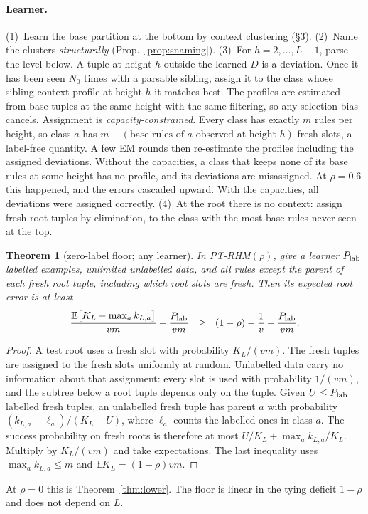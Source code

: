 \documentclass[11pt]{article}
\newtheorem{theorem}{Theorem}
\theoremstyle{definition}
\newcommand{\E}{\mathbb{E}}
\begin{document}
\paragraph{Learner.} (1)~Learn the base partition at the bottom by context clustering
(\S3). (2)~Name the clusters \emph{structurally} (Prop.~\ref{prop:snaming}). (3)~For
$h=2,\dots,L-1$, parse the level below. A tuple at height $h$ outside the learned $D$ is a
deviation. Once it has been seen $N_0$ times with a parsable sibling, assign it to the class
whose sibling-context profile at height $h$ it matches best. The profiles are estimated from
base tuples at the same height with the same filtering, so any selection bias cancels.
Assignment is \emph{capacity-constrained}. Every class has exactly $m$ rules per height, so class
$a$ has $m-(\text{base rules of $a$ observed at height $h$})$ fresh slots, a label-free
quantity. A few EM rounds then re-estimate the profiles including the assigned deviations.
Without the capacities, a class that keeps none of its base rules at some height has no profile,
and its deviations are misassigned. At $\rho=0.6$ this happened, and the errors cascaded upward.
With the capacities, all deviations were assigned correctly. (4)~At
the root there is no context: assign fresh root tuples by elimination, to the class with the
most base rules never seen at the top.

\begin{theorem}[zero-label floor; any learner]\label{thm:ptlower}
In PT-RHM$(\rho)$, give a learner $P_{\rm lab}$ labelled examples, unlimited unlabelled data,
and \emph{all} rules except the parent of each fresh root tuple, including which root slots are
fresh. Then its expected root error is at least
\[
\frac{\E\big[K_L-\max_ak_{L,a}\big]}{vm}-\frac{P_{\rm lab}}{vm}\ \ \ge\ \ (1-\rho)-\frac1v-\frac{P_{\rm lab}}{vm}.
\]
\end{theorem}
\begin{proof}
A test root uses a fresh slot with probability $K_L/(vm)$. The fresh tuples are assigned to the
fresh slots uniformly at random. Unlabelled data carry no information about that assignment:
every slot is used with probability $1/(vm)$, and the subtree below a root tuple depends only on
the tuple. Given $U\le P_{\rm lab}$ labelled fresh tuples, an unlabelled fresh tuple has parent
$a$ with probability $(k_{L,a}-\ell_a)/(K_L-U)$, where $\ell_a$ counts the labelled ones in
class $a$. The success probability on fresh roots is therefore at most
$U/K_L+\max_ak_{L,a}/K_L$. Multiply by $K_L/(vm)$ and take expectations. The last inequality uses
$\max_ak_{L,a}\le m$ and $\E K_L=(1-\rho)vm$.
\end{proof}
\noindent At $\rho=0$ this is Theorem~\ref{thm:lower}. The floor is linear in the tying deficit
$1-\rho$ and does not depend on $L$.
\end{document}
